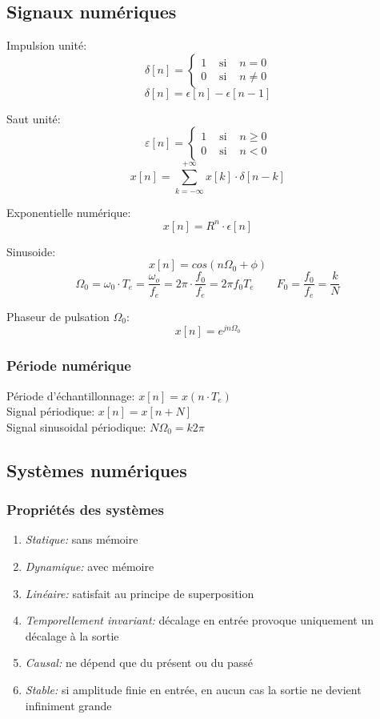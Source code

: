 \documentclass[10pt, twocolumn]{article}
\begin{document}
		\subsection*{Signaux numériques}
			
			Impulsion unité:
			\[
			\delta[n]=\left\{\begin{array}{lll}
			1 & \text { si } & n=0 \\
			0 & \text { si } & n \neq 0
			\end{array}\right.
			\]
			\[\delta [n] = \epsilon [n] - \epsilon[n-1]\]
			
			Saut unité:
			\[
			\varepsilon[n]=\left\{\begin{array}{lll}
			1 & \text { si } & n \geq 0 \\
			0 & \text { si } & n<0
			\end{array}\right.
			\]
			\[x[n]=\sum_{k=-\infty}^{+\infty} x[k] \cdot \delta[n-k]\]
			
			Exponentielle numérique:
			\[x[n] = R^n \cdot \epsilon [n]\]
			
			Sinusoide:
			\[x[n] = cos(n \Omega_0 + \phi)\]
			\[\Omega_0=\omega_0\cdot T_e = \frac{\omega_o}{f_e} = 2\pi\cdot\frac{f_0}{f_e}=2\pi f_0 T_e \qquad F_0=\frac{f_0}{f_e}=\frac{k}{N}\]
			
			Phaseur de pulsation $\Omega_0$:
			\[x[n] = e^{jn\Omega_0}\]
			
			\subsubsection*{Période numérique}
			
				Période d'échantillonnage: $x[n] = x(n \cdot T_e)$ \\
				Signal périodique: $x[n] = x[n+N]$ \\
				Signal sinusoidal périodique: $N\Omega _0 = k2\pi$
			
		\subsection*{Systèmes numériques}
			
			\subsubsection*{Propriétés des systèmes}
			
				\begin{enumerate}
					\item \emph{Statique:} sans mémoire
					\item \emph{Dynamique:} avec mémoire
					\item \emph{Linéaire:} satisfait au principe de superposition
					\item \emph{Temporellement invariant:} décalage en entrée provoque uniquement un décalage à la sortie
					\item \emph{Causal:} ne dépend que du présent ou du passé
					\item \emph{Stable:} si amplitude finie en entrée, en aucun cas la sortie ne devient infiniment grande
				\end{enumerate}
			
\end{document}
